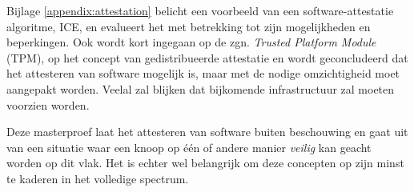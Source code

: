 Bijlage \ref{appendix:attestation} belicht een voorbeeld van een
software-attestatie algoritme, ICE, en evalueert het met betrekking tot zijn
mogelijkheden en beperkingen. Ook wordt kort ingegaan op de zgn. \emph{Trusted
Platform Module} (TPM), op het concept van gedistribueerde attestatie en wordt
geconcludeerd dat het attesteren van software mogelijk is, maar met de nodige
omzichtigheid moet aangepakt worden. Veelal zal blijken dat bijkomende
infrastructuur zal moeten voorzien worden.

Deze masterproef laat het attesteren van software buiten beschouwing en gaat
uit van een situatie waar een knoop op \'e\'en of andere manier \emph{veilig}
kan geacht worden op dit vlak. Het is echter wel belangrijk om deze concepten
op zijn minst te kaderen in het volledige spectrum.

